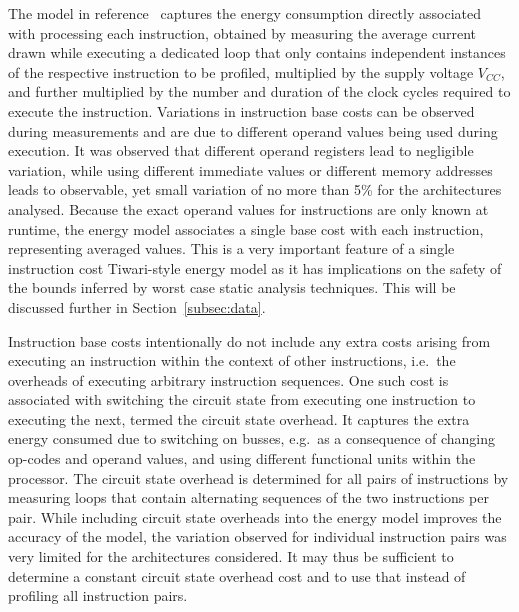 The model in reference~\cite{Tiwari-embedded-1994} captures the energy consumption
directly associated with processing each instruction, obtained by measuring the
average current drawn while executing a dedicated loop that only contains
independent instances of the respective instruction to be profiled, multiplied
by the supply voltage $V_{CC}$, and further multiplied by the number and
duration of the clock cycles required to execute the instruction.
%
Variations in instruction base costs can be observed during measurements and
are due to different operand values being used during execution. It was observed that
different operand registers lead to negligible variation, while using different
immediate values or different memory addresses leads to observable, yet small
variation of no more than 5\% for the architectures analysed.
%
Because the exact operand values for instructions are only known at runtime,
the energy model associates a single base cost with each instruction,
representing averaged values. This is a very important feature of a single
instruction cost Tiwari-style energy model as it has implications on the safety
of the bounds inferred by worst case static analysis techniques. This will be
discussed further in Section~\ref{subsec:data}.

Instruction base costs intentionally do not include any extra costs arising
from executing an instruction within the context of other instructions, i.e.\
the overheads of executing arbitrary instruction sequences.
%
One such cost is associated with switching the circuit state from executing one
instruction to executing the next, termed the circuit state overhead. It
captures the extra energy consumed due to switching on busses, e.g.\ as a
consequence of changing op-codes and operand values, and using different
functional units within the processor. The circuit state overhead is determined
for all pairs of instructions by measuring loops that contain alternating
sequences of the two instructions per pair.
%
While including circuit state overheads into the energy model improves the
accuracy of the model, the variation observed for individual instruction pairs
was very limited for the architectures considered. It may thus be sufficient to
determine a constant circuit state overhead cost and to use that instead of
profiling all instruction pairs.

